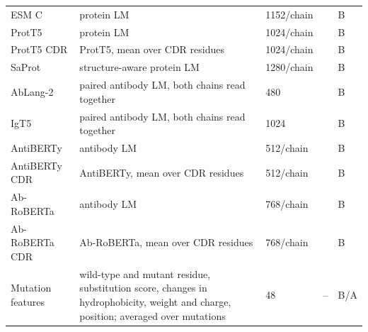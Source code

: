{\begin{longtable}{P{2.8cm}P{4.6cm}P{2.0cm}P{1.5cm}P{1.4cm}}
ESM C & protein LM & 1152/chain & \citep{Candido2026} & B \\
ProtT5 & protein LM & 1024/chain & \citep{Elnaggar2022} & B \\
ProtT5 CDR & ProtT5, mean over CDR residues & 1024/chain & \citep{Elnaggar2022} & B \\
SaProt & structure-aware protein LM & 1280/chain & \citep{Su2023SaProt} & B \\
AbLang-2 & paired antibody LM, both chains read together & 480 & \citep{Olsen2024} & B \\
IgT5 & paired antibody LM, both chains read together & 1024 & \citep{Kenlay2024} & B \\
AntiBERTy & antibody LM & 512/chain & \citep{Ruffolo2021AntiBERTy} & B \\
AntiBERTy CDR & AntiBERTy, mean over CDR residues & 512/chain & \citep{Ruffolo2021AntiBERTy} & B \\
Ab-RoBERTa & antibody LM & 768/chain & \citep{Huh2025} & B \\
Ab-RoBERTa CDR & Ab-RoBERTa, mean over CDR residues & 768/chain & \citep{Huh2025} & B \\
Mutation features & wild-type and mutant residue, substitution score, changes in hydrophobicity, weight and charge, position; averaged over mutations & 48 & -- & B/A \\
\end{longtable}}

